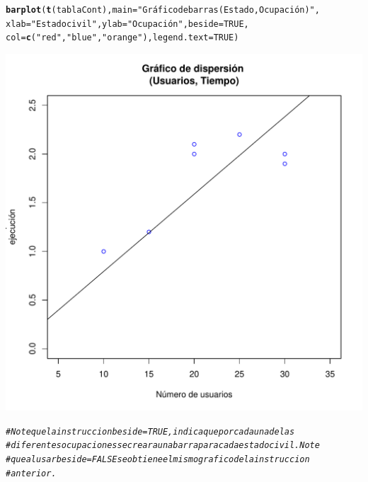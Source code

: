 \documentclass[12pt,letterpaper]{article}\usepackage[]{graphicx}\usepackage[]{color}
\makeatletter
\def\maxwidth{ %
  \ifdim\Gin@nat@width>\linewidth
    \linewidth
  \else
    \Gin@nat@width
  \fi
}
\newcommand{\hlnum}[1]{\textcolor[rgb]{0.686,0.059,0.569}{#1}}%
\newcommand{\hlstr}[1]{\textcolor[rgb]{0.192,0.494,0.8}{#1}}%
\newcommand{\hlcom}[1]{\textcolor[rgb]{0.678,0.584,0.686}{\textit{#1}}}%
\newcommand{\hlstd}[1]{\textcolor[rgb]{0.345,0.345,0.345}{#1}}%
\newcommand{\hlkwc}[1]{\textcolor[rgb]{0.333,0.667,0.333}{#1}}%
\newcommand{\hlkwd}[1]{\textcolor[rgb]{0.737,0.353,0.396}{\textbf{#1}}}%
\newenvironment{kframe}{%
 \def\at@end@of@kframe{}%
 \ifinner\ifhmode%
  \def\at@end@of@kframe{\end{minipage}}%
  \begin{minipage}{\columnwidth}%
 \fi\fi%
 \def\FrameCommand##1{\hskip\@totalleftmargin \hskip-\fboxsep
 \colorbox{shadecolor}{##1}\hskip-\fboxsep
     \hskip-\linewidth \hskip-\@totalleftmargin \hskip\columnwidth}%
 \MakeFramed {\advance\hsize-\width
   \@totalleftmargin\z@ \linewidth\hsize
   \@setminipage}}%
 {\par\unskip\endMakeFramed%
 \at@end@of@kframe}
\newenvironment{knitrout}{}{} %
\makeatother
\begin{document}
\begin{enumerate}
\begin{knitrout}
\begin{kframe}
\begin{alltt}
\hlkwd{barplot}\hlstd{(}\hlkwd{t}\hlstd{(tablaCont),} \hlkwc{main}\hlstd{=}\hlstr{"Gráfico de barras (Estado, Ocupación)"}\hlstd{,}
        \hlkwc{xlab}\hlstd{=}\hlstr{"Estado civil"}\hlstd{,} \hlkwc{ylab}\hlstd{=}\hlstr{"Ocupación"}\hlstd{,} \hlkwc{beside}\hlstd{=}\hlnum{TRUE}\hlstd{,}
        \hlkwc{col}\hlstd{=}\hlkwd{c}\hlstd{(}\hlstr{"red"}\hlstd{,} \hlstr{"blue"}\hlstd{,} \hlstr{"orange"}\hlstd{),}\hlkwc{legend.text}\hlstd{=}\hlnum{TRUE}\hlstd{)}
\end{alltt}
\end{kframe}
\includegraphics[width=\maxwidth]{figure/unnamed-chunk-12-1} 
\begin{kframe}\begin{alltt}
\hlcom{# Note que la instruccion beside =TRUE, indica que por cada una de las}
\hlcom{# diferentes ocupaciones se creara una barra para cada estado civil. Note}
\hlcom{# que al usar beside =FALSE se obtiene el mismo grafico de la instruccion}
\hlcom{# anterior. }
\end{alltt}
\end{kframe}
\end{knitrout}


\end{enumerate}
\end{document}
